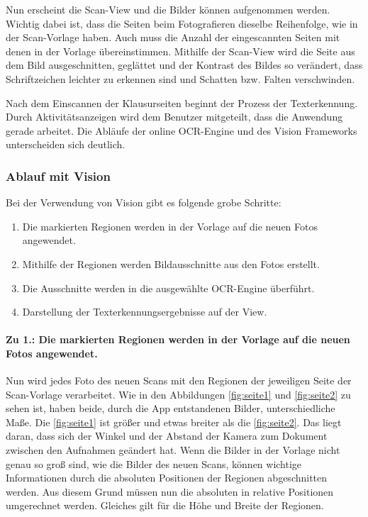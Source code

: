 \documentclass[notables, nomenclature, oneside, 150]{HSMW-Thesis}
\begin{document}
			Nun erscheint die Scan-View und die Bilder können aufgenommen werden. Wichtig dabei ist, dass die Seiten beim Fotografieren dieselbe Reihenfolge, wie in der Scan-Vorlage haben. Auch muss die Anzahl der eingescannten Seiten mit denen in der Vorlage übereinstimmen. Mithilfe der Scan-View wird die Seite aus dem Bild ausgeschnitten, geglättet und der Kontrast des Bildes so verändert, dass Schriftzeichen leichter zu erkennen sind und Schatten bzw. Falten verschwinden.
			
			Nach dem Einscannen der Klausurseiten beginnt der Prozess der Texterkennung. Durch Aktivitätsanzeigen wird dem Benutzer mitgeteilt, dass die Anwendung gerade arbeitet. Die Abläufe der online OCR-Engine und des Vision Frameworks unterscheiden sich deutlich.	

			\subsubsection*{Ablauf mit Vision}
				Bei der Verwendung von Vision gibt es folgende grobe Schritte:
				\vspace{-5mm}
				\begin{enumerate}
					\item Die markierten Regionen werden in der Vorlage auf die neuen Fotos angewendet.
					\item Mithilfe der Regionen werden Bildausschnitte aus den Fotos erstellt.
					\item Die Ausschnitte werden in die ausgewählte OCR-Engine überführt.
					\item Darstellung der Texterkennungsergebnisse auf der View.
				\end{enumerate}
					
				\paragraph*{Zu 1.: Die markierten Regionen werden in der Vorlage auf die neuen Fotos angewendet.}
					Nun wird jedes Foto des neuen Scans mit den Regionen der jeweiligen Seite der Scan-Vorlage verarbeitet. 
					Wie in den Abbildungen \ref{fig:seite1} und \ref{fig:seite2} zu sehen ist, haben beide, durch die App entstandenen Bilder, unterschiedliche Maße. Die \autoref{fig:seite1} ist größer und etwas breiter als die \autoref{fig:seite2}. Das liegt daran, dass sich der Winkel und der Abstand der Kamera zum Dokument zwischen den Aufnahmen geändert hat. Wenn die Bilder in der Vorlage nicht genau so groß sind, wie die Bilder des neuen Scans, können wichtige Informationen durch die absoluten Positionen der Regionen abgeschnitten werden. Aus diesem Grund müssen nun die absoluten in relative Positionen umgerechnet werden. Gleiches gilt für die Höhe und Breite der Regionen.
\end{document}
